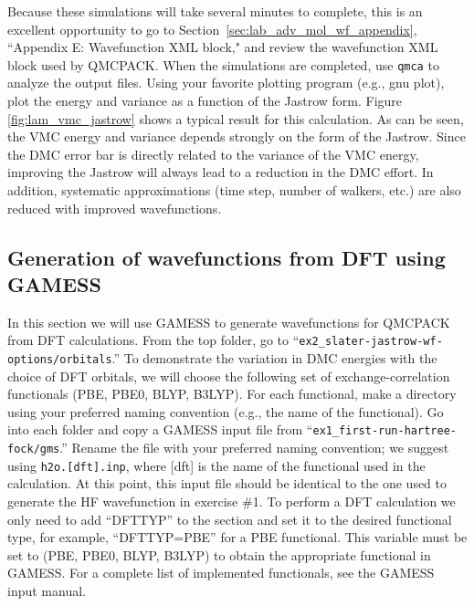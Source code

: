 Because these simulations will take several minutes to complete, this is an excellent opportunity
to go to Section~\ref{sec:lab_adv_mol_wf_appendix}, ``Appendix E: Wavefunction XML block," and review the wavefunction XML block used by QMCPACK. When the
simulations are completed, use \texttt{qmca} to analyze the output files. Using your favorite plotting
program (e.g., gnu plot), plot the energy and variance as a function of the Jastrow form.
Figure \ref{fig:lam_vmc_jastrow} shows a typical result for this calculation. As can be seen, the VMC energy and
variance depends strongly on the form of the Jastrow. Since the DMC error bar is directly
related to the variance of the VMC energy, improving the Jastrow will always lead to a
reduction in the DMC effort. In addition, systematic approximations (time step, number of
walkers, etc.) are also reduced with improved wavefunctions.


\subsection{Generation of wavefunctions from DFT using GAMESS}
In this section we will use GAMESS to generate wavefunctions for QMCPACK from
DFT calculations. From the top folder, go to ``\texttt{ex2\_slater-jastrow-wf-options/orbitals}.'' To demonstrate
the variation in DMC energies with the choice of DFT orbitals, we will choose the following
set of exchange-correlation functionals (PBE, PBE0, BLYP, B3LYP). For each functional,
make a directory using your preferred naming convention (e.g., the name of the functional).
Go into each folder and copy a GAMESS input file from %
``\texttt{ex1\_first-run-hartree-fock/gms}.'' %
 Rename the file with your preferred naming convention; we suggest using \texttt{h2o.[dft].inp}, where [dft] is the name of
the functional used in the calculation. At this point, this input file should be identical to the
one used to generate the HF wavefunction in exercise \#1. To perform a DFT
calculation we only need to add ``DFTTYP'' to the  section and set
it to the desired functional type, for example, ``DFTTYP=PBE'' for a PBE functional. This
variable must be set to (PBE, PBE0, BLYP, B3LYP) to obtain the appropriate functional in
GAMESS. For a complete list of implemented functionals, see the GAMESS input manual.


